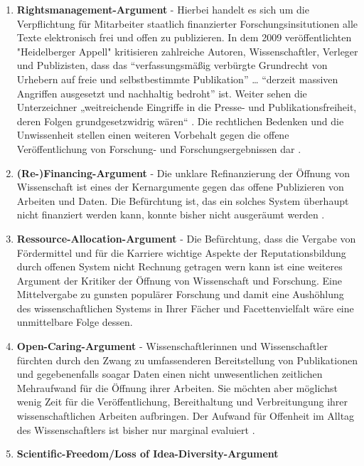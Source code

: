 \begin{enumerate}
\item \textbf{Rightsmanagement-Argument} - Hierbei handelt es sich um die Verpflichtung für Mitarbeiter staatlich finanzierter Forschungsinsitutionen alle Texte elektronisch frei und offen zu publizieren. In dem 2009 veröffentlichten "Heidelberger Appell" \cite{faz_heidelberger_apell_2009} kritisieren zahlreiche Autoren, Wissenschaftler, Verleger und Publizisten, dass das “verfassungsmäßig verbürgte Grundrecht von Urhebern auf freie und selbstbestimmte Publikation” … “derzeit massiven Angriffen ausgesetzt und nachhaltig bedroht” ist. Weiter sehen die Unterzeichner „weitreichende Eingriffe in die Presse- und Publikationsfreiheit, deren Folgen grundgesetzwidrig wären“ \cite{ITK_2009}. Die rechtlichen Bedenken und die Unwissenheit stellen einen weiteren Vorbehalt gegen die offene Veröffentlichung von Forschung- und Forschungsergebnissen dar \cite{weishaupt_2009_goldenOA}.
\item \textbf{(Re-)Financing-Argument} - Die unklare Refinanzierung der Öffnung von Wissenschaft ist eines der Kernargumente gegen das offene Publizieren von Arbeiten und Daten. Die Befürchtung ist, das ein solches System überhaupt nicht finanziert werden kann, konnte bisher nicht ausgeräumt werden \cite{weishaupt_2009_goldenOA}.
\item \textbf{Ressource-Allocation-Argument} - Die Befürchtung, dass die Vergabe von Fördermittel und für die Karriere wichtige Aspekte der Reputationsbildung durch offenen System nicht Rechnung getragen wern kann ist eine weiteres Argument der Kritiker der Öffnung von Wissenschaft und Forschung. Eine Mittelvergabe zu gunsten populärer Forschung und damit eine Aushöhlung des wissenschaftlichen Systems in Ihrer Fächer und Facettenvielfalt wäre eine unmittelbare Folge dessen.
\item \textbf{Open-Caring-Argument} - Wissenschaftlerinnen und Wissenschaftler fürchten durch den Zwang zu umfassenderen Bereitstellung von Publikationen und gegebenenfalls soagar Daten einen nicht unwesentlichen zeitlichen Mehraufwand für die Öffnung ihrer Arbeiten. Sie möchten aber möglichst wenig Zeit für die Veröffentlichung, Bereithaltung und Verbreitungung ihrer wissenschaftlichen Arbeiten aufbringen. Der Aufwand für Offenheit im Alltag des Wissenschaftlers ist bisher nur marginal evaluiert \cite{osterloh2008anreize}.
\item \textbf{Scientific-Freedom/Loss of Idea-Diversity-Argument}

\end{enumerate}
